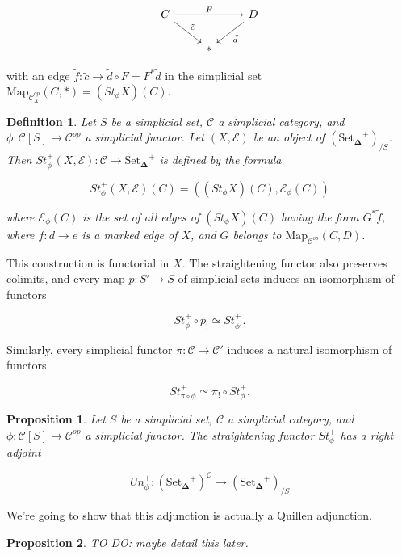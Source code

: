 \documentclass[12pt]{amsart}
\newcommand{\8}{\ensuremath{\infty}}
\newcommand{\C}{\ensuremath{\mathscr{C}}}
\newcommand{\SSet}{\ensuremath{\text{Set}_{\boldsymbol{\Delta}}}}
\newcommand{\Map}{\ensuremath{\text{Map}}}
\newtheorem{definition}{Definition}
\newtheorem{proposition}{Proposition}
\begin{document}
$$
  \begin{tikzcd}
    C\arrow[rr,"F"] \arrow[dr,"\tilde{c}"] &&D\arrow[dl,"\tilde{d}"]\\
    &*
  \end{tikzcd}
$$

with an edge $\tilde{f}:\tilde{c}\rightarrow \tilde{d}\circ F = F^*\tilde{d}$ in the simplicial set $\Map_{\C^{op}_X}(C,*) = (St_\phi X)(C).$

\begin{definition}
  Let $S$ be a simplicial set, $\C$ a simplicial category, and $\phi:\mathscr{C}[S]\rightarrow \C^{op}$ a simplicial functor. Let $(X,\mathcal{E})$ be an object of $(\SSet^+)_{/S}$. Then $St_\phi^+(X,\mathcal{E}):\C\rightarrow \SSet^+$ is defined by the formula

  $$
    St_\phi^+(X,\mathcal{E})(C) = ((St_\phi X)(C),\mathcal{E}_\phi(C))
  $$

  where $\mathcal{E}_\phi (C)$ is the set of all edges of $(St_\phi X)(C)$ having the form $G^*\tilde{f}$, where $f:d\rightarrow e$ is a marked edge of $X$, and $G$ belongs to $\Map_{\C^{op}}(C,D)$.
\end{definition}

This construction is functorial in $X$. The straightening functor also preserves colimits, and every map $p:S'\rightarrow S$ of simplicial sets induces an isomorphism of functors

$$
  St_\phi^+\circ p_! \simeq St^+_{\phi'}.
$$

Similarly, every simplicial functor $\pi:\C\rightarrow \C'$ induces a natural isomorphism of functors

$$
  St^+_{\pi\circ\phi} \simeq \pi_!\circ St^+_\phi.
$$

\begin{proposition}
  Let $S$ be a simplicial set, $\C$ a simplicial category, and $\phi:\mathscr{C}[S]\rightarrow \C^{op}$ a simplicial functor. The straightening functor $St^+_\phi$ has a right adjoint

  $$
    Un_\phi^+:(\SSet^+)^\C\rightarrow (\SSet^+)_{/S}
  $$
\end{proposition}

We're going to show that this adjunction is actually a Quillen adjunction.

\begin{proposition}
  TO DO: maybe detail this later.
\end{proposition}
\end{document}
